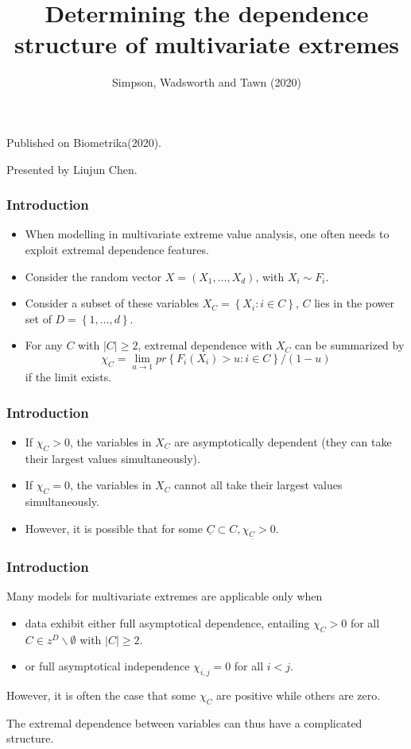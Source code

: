 \documentclass{beamer}
\author{Simpson, Wadsworth and Tawn (2020)}
\title{Determining the dependence structure of multivariate extremes}
\newcommand{\abs}[1]{\left\vert#1\right\vert}
\newcommand{\set}[1]{\left\{#1\right\}}
\begin{document}
\begin{frame}
\titlepage
\begin{center}
    Published on Biometrika(2020). 
    \bigskip

    Presented by Liujun Chen.
\end{center}
\end{frame}



\begin{frame}
    \frametitle{Introduction}
\begin{itemize}
    \item When modelling in multivariate extreme value analysis, one often needs to exploit extremal dependence features.
    \item Consider the random vector $X=(X_1,\dots,X_d)$, with $X_i\sim F_i$.
    \item Consider a subset of these variables $X_C=\set{X_i:i\in C}$, $C$ lies in the power set of $D=\set{1,\dots,d}$.
    \item For any $C$ with $\abs{C}\ge 2$, extremal dependence with $X_C$ can be summarized by 
    $$
\chi_C=\lim_{u\to 1} pr \set{F_i(X_i)>u : i\in C}/(1-u)
    $$
    if the limit exists.
\end{itemize}
    

\end{frame}


\begin{frame}
    \frametitle{Introduction}
    \begin{itemize}
        \item If $\chi_C>0$, the variables in $X_C$ are asymptotically dependent (they can take their largest values simultaneously).
        \bigskip
        \item  If $\chi_C=0$, the variables in $X_C$ cannot all take their largest values simultaneously.
        \bigskip
        \item However, it is possible that for some $\underline{C} \subset C, \chi_{\underline{C}}>0$. 
    \end{itemize}
\end{frame}


\begin{frame}
    \frametitle{Introduction}
    Many models for multivariate extremes are applicable only when
    \begin{itemize}
        \item  data exhibit either full asymptotical dependence, entailing $\chi_C>0$ for all $C\in z^D \backslash \emptyset$ with $\abs{C}\ge 2$.
        \item or full asymptotical independence $\chi_{i,j}=0$ for all $i<j$.
    \end{itemize}
\bigskip

However, it is often the case that some $\chi_C$ are positive while others are zero. 

\bigskip

The extremal dependence between variables can thus have a complicated structure.

    

\end{frame}
\end{document}
